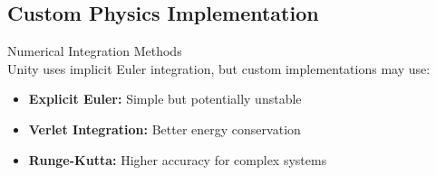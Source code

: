 \subsection{Custom Physics Implementation}

\begin{concept}{Numerical Integration Methods}\\
    Unity uses implicit Euler integration, but custom implementations may use:
    \begin{itemize}
        \item \textbf{Explicit Euler:} Simple but potentially unstable
        \item \textbf{Verlet Integration:} Better energy conservation
        \item \textbf{Runge-Kutta:} Higher accuracy for complex systems
    \end{itemize}
\end{concept}


